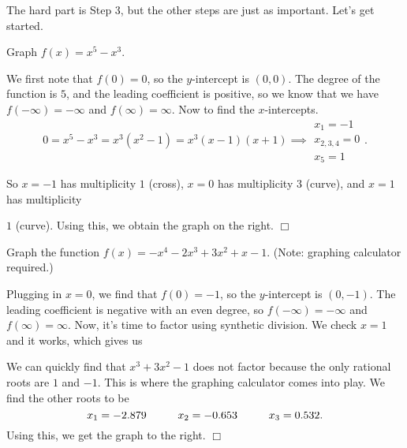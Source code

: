 \documentclass[lang=en,11pt]{elegantbook}
\begin{document}
\begin{wrapfigure}{r}{5cm}
\end{wrapfigure}

The hard part is Step 3, but the other steps are just as important.  Let's get started.

\begin{example}
Graph $f(x)=x^5-x^3$.
\end{example}
\begin{solution}
We first note that $f(0)=0$, so the $y$-intercept is $(0,0)$. The degree of the function is $5$, and the leading coefficient is positive, so we know that we have $f(-\infty)=-\infty$ and $f(\infty)=\infty$.  Now to find the $x$-intercepts. $$0=x^5-x^3=x^3(x^2-1)=x^3(x-1)(x+1) \implies \begin{matrix} x_1=-1 \\ x_{2,3,4}=0 \\ x_5=1 \end{matrix}.$$ 
\end{solution}
\noindent So $x=-1$ has multiplicity $1$ (cross), $x=0$ has multiplicity $3$ (curve), and $x=1$ has multiplicity 

\begin{wrapfigure}{r}{5cm}
\end{wrapfigure}

\noindent $1$ (curve). Using this, we obtain the graph on the right. $\Box$
\begin{example}
Graph the function $f(x)=-x^4-2x^3+3x^2+x-1.$ (Note: graphing calculator required.)
\end{example}
\begin{solution}
Plugging in $x=0$, we find that $f(0)=-1$, so the $y$-intercept is $(0,-1)$. The leading coefficient is negative with an even degree, so $f(-\infty)=-\infty$ and $f(\infty)=\infty$.  Now, it's time to factor using synthetic division.  We check $x=1$ and it works, which gives us


We can quickly find that $x^3+3x^2-1$ does not factor because the only rational roots are $1$ and $-1$.  This is where the graphing calculator comes into play.  We find the other roots to be $$x_1=-2.879 \hspace{10mm} x_2=-0.653 \hspace{10mm} x_3=0.532.$$ Using this, we get the graph to the right. $\Box$
\end{solution}
\end{document}

